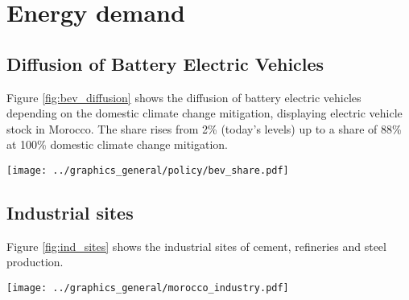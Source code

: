 

\section{Energy demand}

\subsection{Diffusion of Battery Electric Vehicles}
\label{subsec:bev_diffusion}
Figure \ref{fig:bev_diffusion} shows the diffusion of battery electric vehicles depending on the domestic climate change mitigation, displaying electric vehicle stock in Morocco. The share rises from 2\% (today's levels) up to a share of 88\% at 100\% domestic climate change mitigation. %

\begin{figure*}[h]
    \centering
    \texttt{[image: ../graphics\_general/policy/bev\_share.pdf]}
    \caption{Market diffusion of Battery Electricity Vehicles in Morocco, synthesized based on an s-curve with a growth rate $k=0.2$ and inflection point $x_0=2040$.}
    \label{fig:bev_diffusion}
\end{figure*}

\subsection{Industrial sites}

Figure \ref{fig:ind_sites} shows the industrial sites of cement, refineries and steel production.

\begin{figure*}[h]
    \centering
    \texttt{[image: ../graphics\_general/morocco\_industry.pdf]}
    \caption{Industrial sites in Morocco.}
    \label{fig:ind_sites}
\end{figure*}

\clearpage




\clearpage